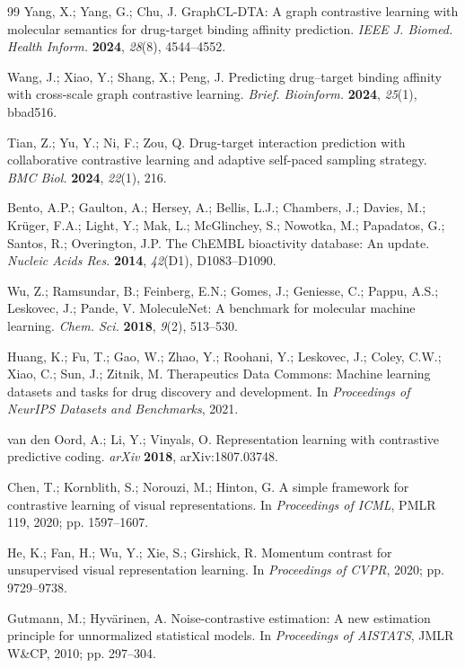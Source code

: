 \documentclass[10pt,a4paper,twocolumn]{article}
\begin{document}
\begin{thebibliography}{99}
Yang, X.; Yang, G.; Chu, J. GraphCL-DTA: A graph contrastive learning with molecular semantics for drug-target binding affinity prediction. \textit{IEEE J. Biomed. Health Inform.} \textbf{2024}, \textit{28}(8), 4544--4552.


Wang, J.; Xiao, Y.; Shang, X.; Peng, J. Predicting drug--target binding affinity with cross-scale graph contrastive learning. \textit{Brief. Bioinform.} \textbf{2024}, \textit{25}(1), bbad516.


Tian, Z.; Yu, Y.; Ni, F.; Zou, Q. Drug-target interaction prediction with collaborative contrastive learning and adaptive self-paced sampling strategy. \textit{BMC Biol.} \textbf{2024}, \textit{22}(1), 216.


Bento, A.P.; Gaulton, A.; Hersey, A.; Bellis, L.J.; Chambers, J.; Davies, M.; Krüger, F.A.; Light, Y.; Mak, L.; McGlinchey, S.; Nowotka, M.; Papadatos, G.; Santos, R.; Overington, J.P. The ChEMBL bioactivity database: An update. \textit{Nucleic Acids Res.} \textbf{2014}, \textit{42}(D1), D1083--D1090.


Wu, Z.; Ramsundar, B.; Feinberg, E.N.; Gomes, J.; Geniesse, C.; Pappu, A.S.; Leskovec, J.; Pande, V. MoleculeNet: A benchmark for molecular machine learning. \textit{Chem. Sci.} \textbf{2018}, \textit{9}(2), 513--530.


Huang, K.; Fu, T.; Gao, W.; Zhao, Y.; Roohani, Y.; Leskovec, J.; Coley, C.W.; Xiao, C.; Sun, J.; Zitnik, M. Therapeutics Data Commons: Machine learning datasets and tasks for drug discovery and development. In \textit{Proceedings of NeurIPS Datasets and Benchmarks}, 2021.


van den Oord, A.; Li, Y.; Vinyals, O. Representation learning with contrastive predictive coding. \textit{arXiv} \textbf{2018}, arXiv:1807.03748.


Chen, T.; Kornblith, S.; Norouzi, M.; Hinton, G. A simple framework for contrastive learning of visual representations. In \textit{Proceedings of ICML}, PMLR 119, 2020; pp. 1597--1607.


He, K.; Fan, H.; Wu, Y.; Xie, S.; Girshick, R. Momentum contrast for unsupervised visual representation learning. In \textit{Proceedings of CVPR}, 2020; pp. 9729--9738.


Gutmann, M.; Hyvärinen, A. Noise-contrastive estimation: A new estimation principle for unnormalized statistical models. In \textit{Proceedings of AISTATS}, JMLR W\&CP, 2010; pp. 297--304.



\end{thebibliography}
\end{document}
